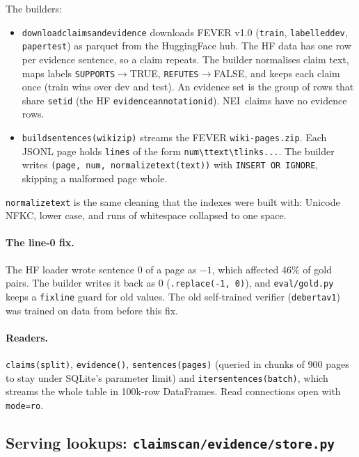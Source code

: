\documentclass[11pt,a4paper]{article}
\makeatletter
\DeclareRobustCommand{\_}{\ifmmode\nfss@text{\textunderscore}\else\textunderscore\allowbreak\fi}
\newcommand{\file}[1]{\texttt{#1}}
\newcommand{\NEI}{\textup{NEI}}
\makeatother
\begin{document}
The builders:
\begin{itemize}
  \item \texttt{download\_claims\_and\_evidence} downloads FEVER v1.0 (\texttt{train}, \texttt{labelled\_dev},
        \texttt{paper\_test}) as parquet from the HuggingFace hub. The HF data has one row per evidence sentence, so a
        claim repeats. The builder normalises claim text, maps labels \texttt{SUPPORTS}$\to$TRUE,
        \texttt{REFUTES}$\to$FALSE, and keeps each claim once (train wins over dev and test). An evidence set is the
        group of rows that share \texttt{set\_id} (the HF \texttt{evidence\_annotation\_id}). \NEI\ claims have no
        evidence rows.
  \item \texttt{build\_sentences(wiki\_zip)} streams the FEVER \texttt{wiki-pages.zip}. Each JSONL page holds
        \texttt{lines} of the form \texttt{num\textbackslash ttext\textbackslash tlinks...}. The builder writes
        \texttt{(page, num, normalize\_text(text))} with \texttt{INSERT OR IGNORE}, skipping a malformed page whole.
\end{itemize}

\texttt{normalize\_text} is the same cleaning that the indexes were built with: Unicode NFKC, lower case, and runs of
whitespace collapsed to one space.

\paragraph{The line-0 fix.} The HF loader wrote sentence 0 of a page as $-1$, which affected 46\% of gold pairs. The
builder writes it back as 0 (\texttt{.replace(-1, 0)}), and \file{eval/gold.py} keeps a \texttt{fix\_line} guard for
old values. The old self-trained verifier (\texttt{deberta\_v1}) was trained on data from before this fix.

\paragraph{Readers.} \texttt{claims(split)}, \texttt{evidence()}, \texttt{sentences(pages)} (queried in chunks of
900 pages to stay under SQLite's parameter limit) and \texttt{iter\_sentences(batch)}, which streams the whole table in
100k-row DataFrames. Read connections open with \texttt{mode=ro}.

\subsection{Serving lookups: \file{claimscan/evidence/store.py}}
\end{document}
